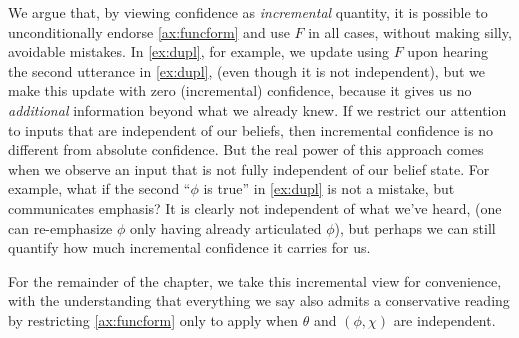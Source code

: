 \begin{subappendices}
    We argue that, by viewing confidence as \emph{incremental} 
    quantity, it is possible to  
    	unconditionally endorse \cref{ax:funcform}
    	and use $F$ in all cases, without making silly, avoidable mistakes.
    In \cref{ex:dupl}, for example, we update using $F$ 
    	upon hearing the second utterance in \cref{ex:dupl},
    	(even though it is not independent),
    	but we make this update with zero (incremental) confidence,
    	because it gives us no \emph{additional} information beyond
    	what we already knew. 
    If we restrict our attention to inputs that are independent of our beliefs, then
    incremental confidence is no different from absolute confidence.
    But the real power of this approach comes when we observe an input
    	that is not fully independent of our belief state. 
    For example, what if the second ``$\phi$ is true'' in \cref{ex:dupl}
    	is not a mistake, but communicates emphasis? 
    It is clearly not independent of what we've heard, 
    	(one can re-emphasize $\phi$ only having already articulated $\phi$),
    	but perhaps we can still
    	quantify how much incremental confidence it carries for us.

    For the remainder of the chapter, we take this incremental view 
    for convenience, with the understanding that everything we say also 
    admits a conservative reading by restricting \cref{ax:funcform} 
    only to apply when $\theta$ and $(\phi,\chi)$ are independent.
    	





\end{subappendices}
